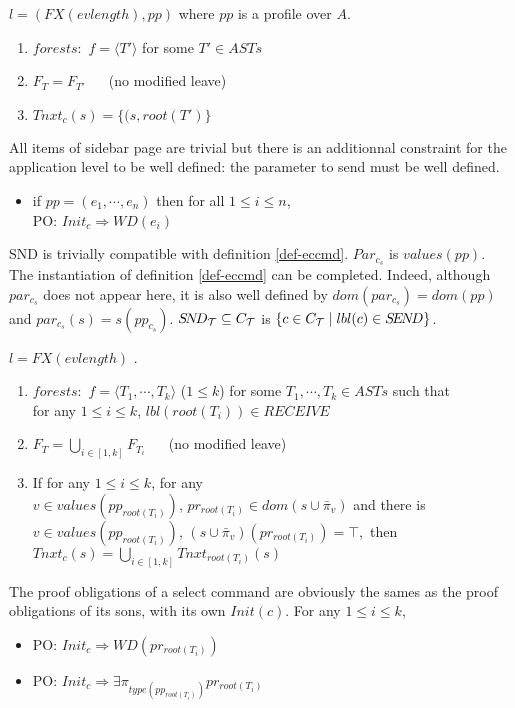 \documentclass{article}
\begin{document}
\begin{definition}[SEND]\label{def-send} $l=(FX(evlength),pp)$ where $pp$ is a profile over $A$.
\begin{enumerate} 
\item $forests:$  $f=\langle T'\rangle$ for some $T'\in ASTs$
\item $F_T=F_{T'}~~~~~~$ {\small (no modified leave)}\setcounter{enumi}{3} 
\item $T\!nxt_c(s)=\{(s,root(T')\}$
\end{enumerate}
\end{definition}
All items of sidebar page \pageref{safestates} are trivial but there is an additionnal constraint for the application level to be well defined: the parameter to send must be well defined.
\begin{itemize}
\item if $pp=(e_1,\cdots,e_n)$ then for all $1\leq i\leq n$,\\
      PO: $Init_c\Rightarrow W\!D(e_i)$
\end{itemize}
SND is trivially compatible with definition \ref{def-eccmd}. $Par_{c_s}$ is $values(pp)$. The instantiation of definition \ref{def-eccmd} can be completed. Indeed, although $par_{c_s}$ does not appear here, it is also well defined by $dom(par_{c_s})=dom(pp)$ and $par_{c_s}(s)=s(pp_{c_s})$. $S\!N\!D_{\cal T}\subseteq C_{\cal T}$ is $\{c\in C_{\cal T}\mid lbl(c)\in S\!E\!N\!D\}$.
\begin{definition}[SELECT] $l=FX(evlength)$ .
\begin{enumerate} 
\item $forests:$  $f=\langle T_1,\cdots,T_k\rangle$ ($1\leq k$) for some $T_1,\cdots,T_k\in ASTs$ such that\\
 for any $1\leq i\leq k$, $lbl(root(T_i))\in REC\!EIV\!E$
\item $F_T=\bigcup_{i\in[1,k]}F_{T_i}~~~~~~$ {\small (no modified leave)}\setcounter{enumi}{3}
\item If for any $1\leq i\leq k$, for any $v\in values(pp_{root(T_i)}),\,pr_{root(T_i)}\in dom(s\cup \bar\pi_v)$  and there is $v\in values(pp_{root(T_i)}),\,(s\cup \bar\pi_v)(pr_{root(T_i)})=\top$,\, then\, $T\!nxt_c(s)=\bigcup_{i\in[1,k]}T\!nxt_{root(T_i)}(s)$
\end{enumerate}
\end{definition}
The proof obligations of a select command are obviously the sames as the proof obligations of its sons, with its own $Init(c)$. For any $1\leq i\leq k$,
\begin{itemize}
\item PO: $Init_c\Rightarrow W\!D(pr_{root(T_i)})$
\item PO: $Init_c\Rightarrow \exists \pi_{type(pp_{root(T_i)})} pr_{root(T_i)}$
\end{itemize}
\end{document}
